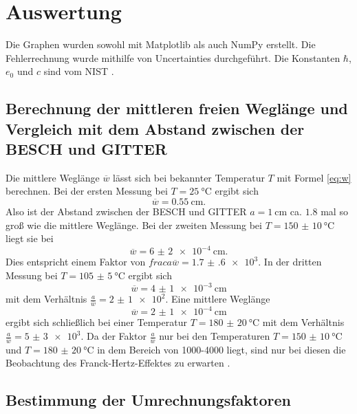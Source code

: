\section{Auswertung}
\label{sec:Auswertung}


Die Graphen wurden sowohl mit Matplotlib \cite{matplotlib} als auch NumPy \cite{numpy} erstellt. Die
Fehlerrechnung wurde mithilfe von Uncertainties \cite{uncertainties} durchgeführt.
Die Konstanten $\hbar$, $e_0$ und $c$ sind vom NIST \cite{nistgov}.

\subsection{Berechnung der mittleren freien Weglänge und Vergleich mit dem Abstand zwischen der BESCH und GITTER}
Die mittlere Weglänge $\overline{w}$ lässt sich bei bekannter Temperatur $T$ mit Formel \ref{eq:w} berechnen.
Bei der ersten Messung bei $T=\SI{25}{\degreeCelsius}$ ergibt sich
\begin{displaymath}
	\overline{w}=\SI{ 0.55}{\centi\meter}\text{.}
\end{displaymath}
Also ist der Abstand zwischen der BESCH und GITTER $a=\SI{1}{\centi\meter}$ ca. $1.8$ mal so groß wie die mittlere Weglänge.
Bei der zweiten Messung bei $T=\SI{150(10)}{\degreeCelsius}$ liegt sie bei
\begin{displaymath}
\overline{w}=\SI{6(2)e-4}{\centi\meter}\text{.}
\end{displaymath}
Dies entspricht einem Faktor von $frac{a}{\overline{w}}=\num{1.7(6)e3}$. In der dritten Messung bei $T=\SI{105(5)}{\degreeCelsius}$ ergibt sich
\begin{displaymath}
\overline{w}=\SI{4(1)e-3}{\centi\meter}
\end{displaymath}
mit dem Verhältnis $\frac{a}{\overline{w}}=\num{2(1)e2}$. Eine mittlere Weglänge
\begin{displaymath}
\overline{w}=\SI{2(1)e-4}{\centi\meter}
\end{displaymath}
ergibt sich schließlich bei einer Temperatur $T=\SI{180(20)}{\degreeCelsius}$ mit dem Verhältnis $\frac{a}{\overline{w}}=\num{5(3)e3}$. Da der Faktor $\frac{a}{\overline{w}}$ nur bei den Temperaturen $T=\SI{150(10)}{\degreeCelsius}$ und $T=\SI{180(20)}{\degreeCelsius}$ in dem Bereich von 1000-4000 liegt, sind nur bei diesen die Beobachtung des Franck-Hertz-Effektes zu erwarten \cite{V601}.


\subsection{Bestimmung der Umrechnungsfaktoren}

